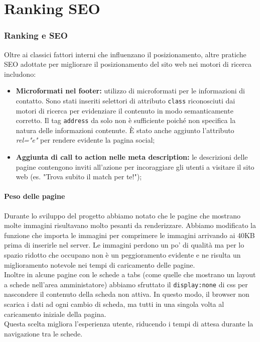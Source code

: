 
\section{Ranking SEO}
\subsubsection{Ranking e SEO}
Oltre ai classici fattori interni che influenzano il posizionamento, altre pratiche SEO adottate per migliorare il posizionamento del sito web nei motori di ricerca includono:
\begin{itemize}
    \item \textbf{Microformati nel footer:} utilizzo di microformati per le informazioni di contatto. Sono stati inseriti selettori di attributo \texttt{class} riconosciuti dai motori di ricerca per evidenziare il contenuto in modo semanticamente corretto. Il tag \texttt{address} da solo non è sufficiente poiché non specifica la natura delle informazioni contenute. È stato anche aggiunto l'attributo \textit{rel="e"} per rendere evidente la pagina social;
    \item \textbf{Aggiunta di call to action nelle meta description:} le descrizioni delle pagine contengono inviti all'azione per incoraggiare gli utenti a visitare il sito web (es. "Trova subito il match per te!");
\end{itemize}
\paragraph{Peso delle pagine}
Durante lo sviluppo del progetto abbiamo notato che le pagine che mostrano molte immagini risultavano molto pesanti da renderizzare. Abbiamo modificato la funzione che importa le immagini per comprimere le immagini arrivando ai 40KB prima di inserirle nel server. Le immagini perdono un po' di qualità ma per lo spazio ridotto che occupano non è un peggioramento evidente e ne risulta un miglioramento notevole nei tempi di caricamento delle pagine.\\
Inoltre in alcune pagine con le schede a tabs (come quelle che mostrano un layout a schede nell'area amministatore) abbiamo sfruttato il \texttt{display:none} di css per nascondere il contenuto della scheda non attiva. In questo modo, il browser non scarica i dati ad ogni cambio di scheda, ma tutti in una singola volta al caricamento iniziale della pagina. \\
Questa scelta migliora l'esperienza utente, riducendo i tempi di attesa durante la navigazione tra le schede.

